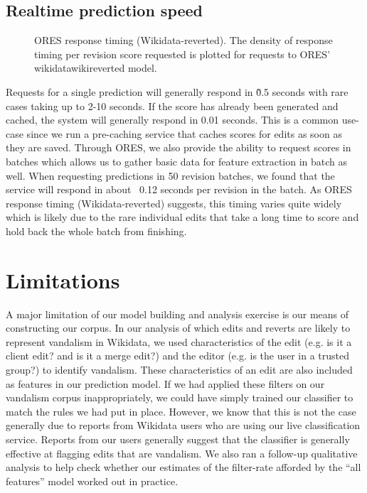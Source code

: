 \documentclass{sig-alternate}
\begin{document}
\subsection{Realtime prediction speed}
\begin{figure}
\centering
{}
\caption{ORES response timing (Wikidata-reverted). The density of response timing per revision score requested is plotted for requests to ORES' wikidatawiki\-reverted model.}
\end{figure}
Requests for a single prediction will generally respond in \~0.5 seconds with rare cases taking up to 2-10 seconds.  If the score has already been generated and cached, the system will generally respond in 0.01 seconds.  This is a common use-case since we run a pre-caching service that caches scores for edits as soon as they are saved.  Through ORES, we also provide the ability to request scores in batches which allows us to gather basic data for feature extraction in batch as well.  When requesting predictions in 50 revision batches, we found that the service will respond in about ~0.12 seconds per revision in the batch.  As ORES response timing (Wikidata-reverted) suggests, this timing varies quite widely which is likely due to the rare individual edits that take a long time to score and hold back the whole batch from finishing.

\section{Limitations}

A major limitation of our model building and analysis exercise is our means of constructing our corpus. In our analysis of which edits and reverts are likely to represent vandalism in Wikidata, we used characteristics of the edit (e.g. is it a client edit? and is it a merge edit?) and the editor (e.g. is the user in a trusted group?) to identify vandalism. These characteristics of an edit are also included as features in our prediction model. If we had applied these filters on our vandalism corpus inappropriately, we could have simply trained our classifier to match the rules we had put in place. However, we know that this is not the case generally due to reports from Wikidata users who are using our live classification service. Reports from our users generally suggest that the classifier is generally effective at flagging edits that are vandalism. We also ran a follow-up qualitative analysis to help check whether our estimates of the filter-rate afforded by the ``all features'' model worked out in practice.
\end{document}
